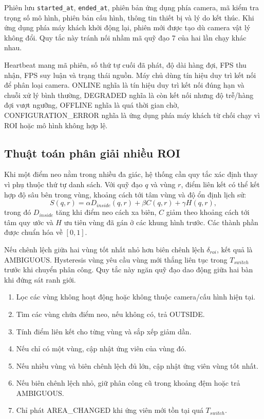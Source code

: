 Phiên lưu \texttt{started\_at}, \texttt{ended\_at}, phiên bản ứng dụng phía camera, mã kiểm tra trọng số mô hình, phiên bản cấu hình, thông tin thiết bị và lý do kết thúc. Khi ứng dụng phía máy khách khởi động lại, phiên mới được tạo dù camera vật lý không đổi. Quy tắc này tránh nối nhầm mã quỹ đạo 7 của hai lần chạy khác nhau.

Heartbeat mang mã phiên, số thứ tự cuối đã phát, độ dài hàng đợi, FPS thu nhận, FPS suy luận và trạng thái nguồn. Máy chủ dùng tín hiệu duy trì kết nối để phân loại camera. ONLINE nghĩa là tín hiệu duy trì kết nối đúng hạn và chuỗi xử lý bình thường, DEGRADED nghĩa là còn kết nối nhưng độ trễ/hàng đợi vượt ngưỡng, OFFLINE nghĩa là quá thời gian chờ, CONFIGURATION\_ERROR nghĩa là ứng dụng phía máy khách từ chối chạy vì ROI hoặc mô hình không hợp lệ.

\subsection{Thuật toán phân giải nhiều ROI}
Khi một điểm neo nằm trong nhiều đa giác, hệ thống cần quy tắc xác định thay vì phụ thuộc thứ tự danh sách. Với quỹ đạo $q$ và vùng $r$, điểm liên kết có thể kết hợp độ sâu bên trong vùng, khoảng cách tới tâm vùng và độ ổn định lịch sử:
\begin{equation}
 S(q,r)=\alpha D_{inside}(q,r)+\beta C(q,r)+\gamma H(q,r),
\end{equation}
trong đó $D_{inside}$ tăng khi điểm neo cách xa biên, $C$ giảm theo khoảng cách tới tâm quy ước và $H$ ưu tiên vùng đã gán ở các khung hình trước. Các thành phần được chuẩn hóa về $[0,1]$.

Nếu chênh lệch giữa hai vùng tốt nhất nhỏ hơn biên chênh lệch $\delta_{roi}$, kết quả là AMBIGUOUS. Hysteresis vùng yêu cầu vùng mới thắng liên tục trong $T_{switch}$ trước khi chuyển phân công. Quy tắc này ngăn quỹ đạo dao động giữa hai bàn khi đứng sát ranh giới.

\begin{enumerate}
\item Lọc các vùng không hoạt động hoặc không thuộc camera/cấu hình hiện tại.
\item Tìm các vùng chứa điểm neo, nếu không có, trả OUTSIDE.
\item Tính điểm liên kết cho từng vùng và sắp xếp giảm dần.
\item Nếu chỉ có một vùng, cập nhật ứng viên của vùng đó.
\item Nếu nhiều vùng và biên chênh lệch đủ lớn, cập nhật ứng viên vùng tốt nhất.
\item Nếu biên chênh lệch nhỏ, giữ phân công cũ trong khoảng đệm hoặc trả AMBIGUOUS.
\item Chỉ phát AREA\_CHANGED khi ứng viên mới tồn tại quá $T_{switch}$.
\end{enumerate}

